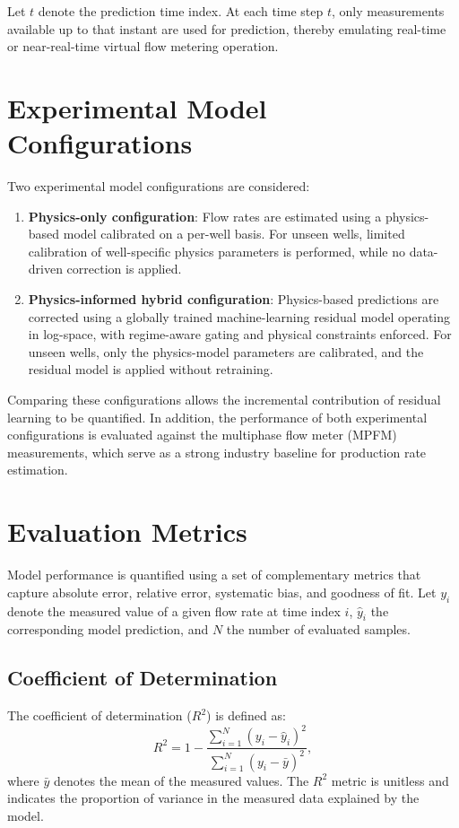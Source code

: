 \documentclass[12pt,APA]{uomthesis}
\begin{document}
Let $t$ denote the prediction time index. At each time step $t$, only measurements available up to that instant are used for prediction, thereby emulating real-time or near-real-time virtual flow metering operation.

\section{Experimental Model Configurations}
Two experimental model configurations are considered:

\begin{enumerate}
    \item \textbf{Physics-only configuration}:  
    Flow rates are estimated using a physics-based model calibrated on a per-well basis. For unseen wells, limited calibration of well-specific physics parameters is performed, while no data-driven correction is applied.

    \item \textbf{Physics-informed hybrid configuration}:  
    Physics-based predictions are corrected using a globally trained machine-learning residual model operating in log-space, with regime-aware gating and physical constraints enforced. For unseen wells, only the physics-model parameters are calibrated, and the residual model is applied without retraining.
\end{enumerate}

Comparing these configurations allows the incremental contribution of residual learning to be quantified. In addition, the performance of both experimental configurations is evaluated against the multiphase flow meter (MPFM) measurements, which serve as a strong industry baseline for production rate estimation.

\section{Evaluation Metrics}
\label{sec:evaluation_metrics}
Model performance is quantified using a set of complementary metrics that capture absolute error, relative error, systematic bias, and goodness of fit. Let $y_i$ denote the measured value of a given flow rate at time index $i$, $\hat{y}_i$ the corresponding model prediction, and $N$ the number of evaluated samples.

\subsection{Coefficient of Determination}
The coefficient of determination ($R^2$) is defined as:
\begin{equation}
R^2 = 1 - \frac{\sum_{i=1}^{N} (y_i - \hat{y}_i)^2}
{\sum_{i=1}^{N} (y_i - \bar{y})^2},
\end{equation}
where $\bar{y}$ denotes the mean of the measured values. The $R^2$ metric is unitless and indicates the proportion of variance in the measured data explained by the model.
\end{document}
